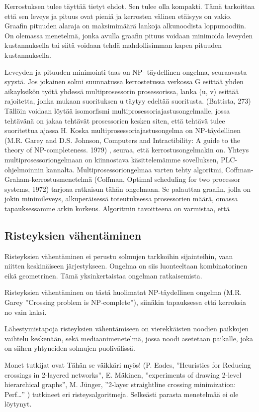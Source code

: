 \documentclass[finnish,12pt]{article}
\begin{document}
Kerrostuksen tulee täyttää tietyt ehdot.
Sen tulee olla kompakti.
Tämä tarkoittaa että sen leveys ja pituus ovat pieniä ja kerrosten välinen etäisyys on vakio.
Graafin pituuden alaraja on maksimimäärä lankoja alkunoodista loppunoodiin.
On olemassa menetelmä, jonka avulla graafin pituus voidaan minimoida leveyden kustannuksella tai siitä voidaan tehdä mahdollisimman kapea pituuden kustannuksella.

Leveyden ja pituuden minimointi taas on NP- täydellinen ongelma, seuraavasta syystä.
Jos jokainen solmi suunnatussa kerrostetussa verkossa G esittää yhden aikayksikön työtä yhdessä multiprosessorin prosessorissa, lanka (u, v) esittää rajoitetta, jonka mukaan suorituksen u täytyy edeltää suoritusta. (Battista, 273)
Tällöin voidaan löytää isomorfismi multiprosessoriajastusongelmalle, jossa tehtävänä on jakaa tehtävät prosessorien kesken siten, että tehtävä tulee suoritettua ajassa H.
Koska multiprosessoriajastusongelma on NP-täydellinen (M.R. Garey and D.S. Johnson, Computers and Intractibility: A guide to the theory of NP-completeness. 1979) , seuraa, että kerrostusongelmakin on.
Yhteys multiprosessoriongelmaan on kiinnostava käsittelemämme sovelluksen, PLC-ohjelmoinnin kannalta.
Multiprosessoriongelmaa varten tehty algoritmi, Coffman-Graham-kerrostusmenetelmä (Coffman, Optimal scheduling for two processor systems, 1972) tarjoaa ratkaisun tähän ongelmaan.
Se palauttaa graafin, jolla on jokin minimileveys, alkuperäisessä toteutuksessa prosessorien määrä, omassa tapauksessamme arkin korkeus. 
Algoritmin tavoitteena on varmistaa, että 

	\subsection{Risteyksien vähentäminen}

Risteyksien vähentäminen ei perustu solmujen tarkkoihin sijainteihin, vaan niitten keskinäiseen järjestykseen.
Ongelma on siis luonteeltaan kombinatorinen eikä geometrinen.
Tämä yksinkertaistaa ongelman ratkaisemista. 

Risteyksien vähentäminen on tästä huolimatat NP-täydellinen ongelma (M.R. Garey ”Crossing problem is NP-complete”), siinäkin tapauksessa että kerroksia no vain kaksi.

Lähestymistapoja risteyksien vähentämiseen on vierekkäisten noodien paikkojen vaihtelu keskenään, sekä mediaanimenetelmä, jossa noodi asetetaan paikalle, joka on siihen yhtyneiden solmujen puolivälissä.

Monet tutkijat ovat Tähän se väikkäri myös! (P. Eades, ”Heuristics for Reducing crossings in 2-layered networks”, E. Mäkinen, ”experiments of drawing 2-level hierarchical graphs”, M. Jünger, ”2-layer straightline crossing minimization: Perf…” ) tutkineet eri risteysalgoritmeja. Selkeästi parasta menetelmää ei ole löytynyt.
\end{document}
